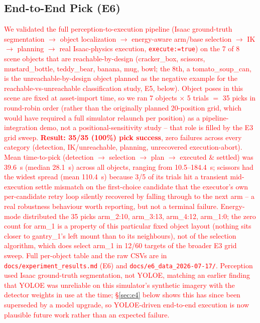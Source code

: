 \documentclass[conference]{IEEEtran}
\begin{document}
\subsection{End-to-End Pick (E6)}
\textcolor{red}{We validated the full perception-to-execution pipeline (Isaac
ground-truth segmentation $\rightarrow$ object localization $\rightarrow$
energy-aware arm/base selection $\rightarrow$ IK $\rightarrow$ planning
$\rightarrow$ real Isaac-physics execution, \texttt{execute:=true}) on the
7 of 8 scene objects that are reachable-by-design (cracker\_box, scissors,
mustard\_bottle, teddy\_bear, banana, mug, bowl; the 8th, a tomato\_soup\_can,
is the unreachable-by-design object planned as the negative example for the
reachable-vs-unreachable classification study, E5, below). Object poses in
this scene are fixed at asset-import
time, so we ran 7 objects $\times$ 5 trials $=$ 35 picks in round-robin order
(rather than the originally planned 20-position grid, which would have
required a full simulator relaunch per position) as a pipeline-integration
demo, not a positional-sensitivity study -- that role is filled by the E3
grid sweep. \textbf{Result: 35/35 (100\%) pick success}, zero failures across every category
(detection, IK/unreachable, planning, unrecovered execution-abort). Mean time-to-pick
(detection $\to$ selection $\to$ plan $\to$ executed \& settled) was 39.6~s
(median 28.1~s) across all objects, ranging from 10.5--184.4~s; scissors had
the widest spread (mean 110.4~s) because 3/5 of its trials hit a transient
mid-execution settle mismatch on the first-choice candidate that the
executor's own per-candidate retry loop silently recovered by falling
through to the next arm -- a real robustness behaviour worth reporting, but
not a terminal failure. Energy-mode distributed the 35 picks arm\_2:10,
arm\_3:13, arm\_4:12, arm\_1:0; the zero count for arm\_1 is a property of
this particular fixed object layout (nothing sits closer to gantry\_1's left
mount than to its neighbours), not of the selection algorithm, which does
select arm\_1 in 12/60 targets of the broader E3 grid sweep. Full per-object
table and the raw CSVs are in \texttt{docs/experiment\_results.md} (E6) and
\texttt{docs/e6\_data\_2026-07-17/}. Perception used Isaac ground-truth
segmentation, not YOLOE, matching an earlier finding that YOLOE was
unreliable on this simulator's synthetic imagery with the detector weights in
use at the time; \S\ref{sec:e4} below shows this has since been superseded by
a model upgrade, so YOLOE-driven end-to-end execution is now plausible future
work rather than an expected failure.}
\end{document}
